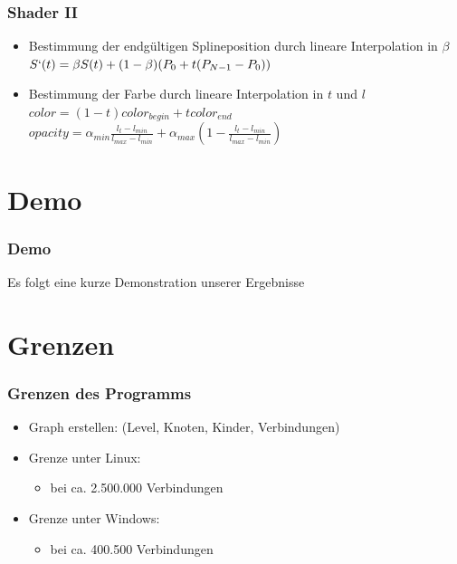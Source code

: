 \documentclass[11pt]{beamer}
\begin{document}
\begin{frame}
\frametitle{Shader II}
\begin{itemize}
\item Bestimmung der endgültigen Splineposition durch lineare Interpolation in $\beta$\\
$S`(t)=\beta S(t) + (1-\beta)(P_0 + t(P_{N-1} - P_0))$

\item Bestimmung der Farbe durch lineare Interpolation in $t$ und $l$
$color =(1-t) color_{begin} + t color_{end}$
$opacity = \alpha_{min} \frac{l_t-l_{min}}{l_{max}-l_{min}} + \alpha_{max} (1-\frac{l_t-l_{min}}{l_{max}-l_{min}})$
\end{itemize}
\end{frame}

\section{Demo}
\begin{frame}
\frametitle{Demo}

Es folgt eine kurze Demonstration unserer Ergebnisse

\end{frame}



\section{Grenzen}
\begin{frame}
\frametitle{Grenzen des Programms}

\begin{itemize}
\item Graph erstellen: (Level, Knoten, Kinder, Verbindungen)
\item Grenze unter Linux:
 \begin{itemize} 
 \item bei ca. 2.500.000 Verbindungen 
 \end{itemize}
\item Grenze unter Windows:
	\begin{itemize}
	\item bei ca. 400.500 Verbindungen
	\end {itemize}
\end{itemize}

\end{frame}
\end{document}

